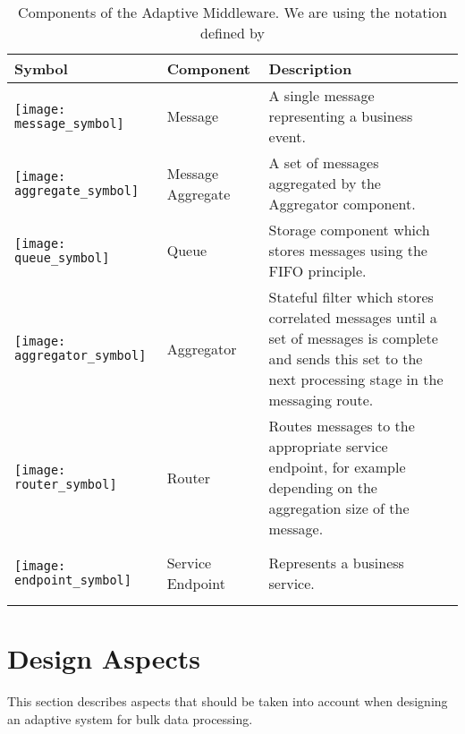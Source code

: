 \begin{table}[htpb]
	\caption{Components of the Adaptive Middleware. We are using the notation defined by \cite{Hohpe:2003fk}}
	\label{table:ch4_middleware_components}
	\centering
	\begin{tabular}{|m{3cm}|m{2cm}|m{5cm}|}
		\hline
		\bfseries Symbol & \bfseries Component & \bfseries Description\\
		\hline 
		\begin{center}
			\texttt{[image: message\_symbol]}
		\end{center} 
		& Message & A single message representing a business event.\\
		\hline 
		\begin{center}
			\texttt{[image: aggregate\_symbol]} 
		\end{center}
		& Message Aggregate & A set of messages aggregated by the Aggregator component.\\
		\hline
		\begin{center}
			\texttt{[image: queue\_symbol]} 
		\end{center}
		& Queue & Storage component which stores messages using the \ac{FIFO} principle.\\
		\hline 
		\begin{center}
			\texttt{[image: aggregator\_symbol]}
		\end{center}
		& Aggregator & Stateful filter which stores correlated messages until a set of messages is complete and sends this set to the next processing stage in the messaging route.\\
		\hline
		\begin{center}
			\texttt{[image: router\_symbol]} 
		\end{center}
		& Router & Routes messages to the appropriate service endpoint, for example depending on the aggregation size of the message.\\
		\hline
		\begin{center}
			\texttt{[image: endpoint\_symbol]} 
		\end{center}
		& Service Endpoint & Represents a business service.\\
		\hline
	\end{tabular}
\end{table}

\section{Design Aspects}
\label{sec:ch05_design_aspects}
This section describes aspects that should be taken into account when designing an adaptive system for bulk data processing.

